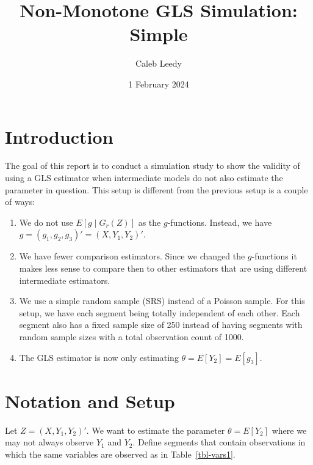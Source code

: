 \documentclass[
  letterpaper,
  DIV=11,
  numbers=noendperiod]{scrartcl}
\title{Non-Monotone GLS Simulation: Simple}
\author{Caleb Leedy}
\date{1 February 2024}
\providecommand{\tightlist}{%
  \setlength{\itemsep}{0pt}\setlength{\parskip}{0pt}}\usepackage{longtable,booktabs,array}
\begin{document}
\maketitle
\ifdefined\Shaded\renewenvironment{Shaded}{\begin{tcolorbox}[borderline west={3pt}{0pt}{shadecolor}, frame hidden, boxrule=0pt, interior hidden, sharp corners, enhanced, breakable]}{\end{tcolorbox}}\fi

\hypertarget{introduction}{%
\section{Introduction}\label{introduction}}

The goal of this report is to conduct a simulation study to show the
validity of using a GLS estimator when intermediate models do not also
estimate the parameter in question. This setup is different from the
previous setup is a couple of ways:

\begin{enumerate}
\def\labelenumi{\arabic{enumi}.}
\tightlist
\item
  We do not use \(E[g \mid G_r(Z)]\) as the \(g\)-functions. Instead, we
  have \(g = (g_1, g_2, g_3)' = (X, Y_1, Y_2)'\).
\item
  We have fewer comparison estimators. Since we changed the
  \(g\)-functions it makes less sense to compare then to other
  estimators that are using different intermediate estimators.
\item
  We use a simple random sample (SRS) instead of a Poisson sample. For
  this setup, we have each segment being totally independent of each
  other. Each segment also has a fixed sample size of 250 instead of
  having segments with random sample sizes with a total observation
  count of 1000.
\item
  The GLS estimator is now only estimating \(\theta = E[Y_2] = E[g_3]\).
\end{enumerate}

\hypertarget{notation-and-setup}{%
\section{Notation and Setup}\label{notation-and-setup}}

Let \(Z = (X, Y_1, Y_2)'\). We want to estimate the parameter
\(\theta = E[Y_2]\) where we may not always observe \(Y_1\) and \(Y_2\).
Define segments that contain observations in which the same variables
are observed as in Table~\ref{tbl-vars1}.
\end{document}
